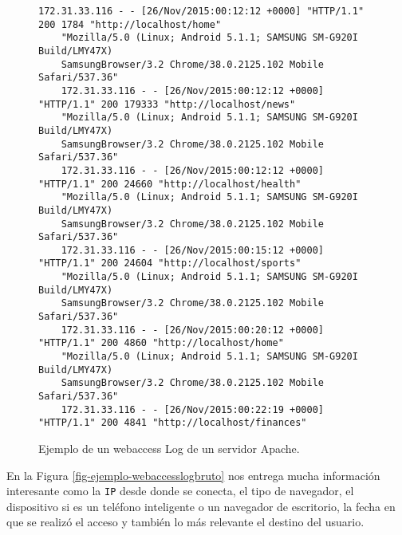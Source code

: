 \begin{figure}[tb]\label{fig-ejemplo-webaccesslogbruto} 
	\centering
	\begin{lstlisting}[frame=single,basicstyle=\ttfamily\tiny,]
	172.31.33.116 - - [26/Nov/2015:00:12:12 +0000] "HTTP/1.1" 200 1784 "http://localhost/home" 
	"Mozilla/5.0 (Linux; Android 5.1.1; SAMSUNG SM-G920I Build/LMY47X) 
	SamsungBrowser/3.2 Chrome/38.0.2125.102 Mobile Safari/537.36"
	172.31.33.116 - - [26/Nov/2015:00:12:12 +0000] "HTTP/1.1" 200 179333 "http://localhost/news" 
	"Mozilla/5.0 (Linux; Android 5.1.1; SAMSUNG SM-G920I Build/LMY47X) 
	SamsungBrowser/3.2 Chrome/38.0.2125.102 Mobile Safari/537.36"
	172.31.33.116 - - [26/Nov/2015:00:12:12 +0000] "HTTP/1.1" 200 24660 "http://localhost/health" 
	"Mozilla/5.0 (Linux; Android 5.1.1; SAMSUNG SM-G920I Build/LMY47X) 
	SamsungBrowser/3.2 Chrome/38.0.2125.102 Mobile Safari/537.36"
	172.31.33.116 - - [26/Nov/2015:00:15:12 +0000] "HTTP/1.1" 200 24604 "http://localhost/sports" 
	"Mozilla/5.0 (Linux; Android 5.1.1; SAMSUNG SM-G920I Build/LMY47X) 
	SamsungBrowser/3.2 Chrome/38.0.2125.102 Mobile Safari/537.36"
	172.31.33.116 - - [26/Nov/2015:00:20:12 +0000] "HTTP/1.1" 200 4860 "http://localhost/home" 
	"Mozilla/5.0 (Linux; Android 5.1.1; SAMSUNG SM-G920I Build/LMY47X) 
	SamsungBrowser/3.2 Chrome/38.0.2125.102 Mobile Safari/537.36"
	172.31.33.116 - - [26/Nov/2015:00:22:19 +0000] "HTTP/1.1" 200 4841 "http://localhost/finances" 
	\end{lstlisting}
	
	
	
	\caption{Ejemplo de un webaccess Log de un servidor Apache.}
	\label{fig:accesslog-apache-teleton}
\end{figure}


  En la Figura \ref{fig-ejemplo-webaccesslogbruto} nos entrega mucha información interesante como la \texttt{IP} desde donde se conecta, el tipo de navegador, el dispositivo si es un teléfono inteligente o un navegador de escritorio, la fecha en que se realizó el acceso y también lo más relevante el destino del usuario.
  
  
  
  